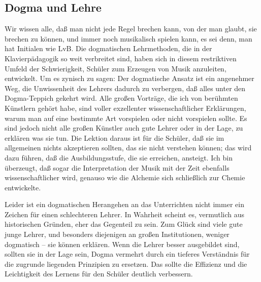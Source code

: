 \subsection{Dogma und Lehre}
\label{c3_3g}

Wir wissen alle, daß man nicht jede Regel brechen kann, von der man glaubt, sie brechen zu können, und immer noch musikalisch spielen kann, es sei denn, man hat Initialen wie LvB.
Die dogmatischen Lehrmethoden, die in der Klavierpädagogik so weit verbreitet sind, haben sich in diesem restriktiven Umfeld der Schwierigkeit, Schüler zum Erzeugen von Musik anzuleiten, entwickelt.
Um es zynisch zu sagen: Der dogmatische Ansatz ist ein angenehmer Weg, die Unwissenheit des Lehrers dadurch zu verbergen, daß alles unter den Dogma-Teppich gekehrt wird.
Alle großen Vorträge, die ich von berühmten Künstlern gehört habe, sind voller exzellenter wissenschaftlicher Erklärungen, warum man auf eine bestimmte Art vorspielen oder nicht vorspielen sollte.
Es sind jedoch nicht alle großen Künstler auch gute Lehrer oder in der Lage, zu erklären was sie tun.
Die Lektion daraus ist für die Schüler, daß sie im allgemeinen nichts akzeptieren sollten, das sie nicht verstehen können; das wird dazu führen, daß die Ausbildungsstufe, die sie erreichen, ansteigt.
Ich bin überzeugt, daß sogar die Interpretation der Musik mit der Zeit ebenfalls wissenschaftlicher wird, genauso wie die Alchemie sich schließlich zur Chemie entwickelte.

Leider ist ein dogmatischen Herangehen an das Unterrichten nicht immer ein Zeichen für einen schlechteren Lehrer.
In Wahrheit scheint es, vermutlich aus historischen Gründen, eher das Gegenteil zu sein.
Zum Glück sind viele gute junge Lehrer, und besonders diejenigen an großen Institutionen, weniger dogmatisch -- sie können erklären.
Wenn die Lehrer besser ausgebildet sind, sollten sie in der Lage sein, Dogma vermehrt durch ein tieferes Verständnis für die zugrunde liegenden Prinzipien zu ersetzen.
Das sollte die Effizienz und die Leichtigkeit des Lernens für den Schüler deutlich verbessern.

